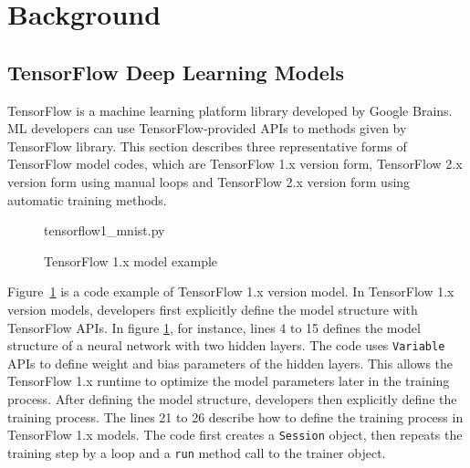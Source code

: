 \section{Background}\label{sec:background}
\subsection{TensorFlow Deep Learning Models}

TensorFlow\cite{tensorflow} is a machine learning platform library
developed by Google Brains.
ML developers can use TensorFlow-provided APIs to 
methods given by TensorFlow library.
This section describes three representative forms of TensorFlow
model codes, which are TensorFlow 1.x version form, 
TensorFlow 2.x version form using manual loops and
TensorFlow 2.x version form using automatic training methods.

\begin{figure}[ht!]

{tensorflow1_mnist.py}
  \caption{TensorFlow 1.x model example}
\label{fig:back:tf1}
\end{figure}

Figure~\ref{fig:back:tf1} is a code example of TensorFlow 1.x version model.
In TensorFlow 1.x version models, developers first explicitly define
the model structure with TensorFlow APIs.
In figure \ref{fig:back:tf1}, for instance, lines 4 to 15 defines the model
structure of a neural network with two hidden layers.
The code uses {\tt Variable} APIs to define weight and bias parameters of
the hidden layers. This allows the TensorFlow 1.x runtime to
optimize the model parameters later in the training process.
After defining the model structure, developers then
explicitly define the training process.
The lines 21 to 26 describe how to define the training process in TensorFlow
1.x models. The code first creates a {\tt Session} object,
then repeats the training step by a loop and a {\tt run} method call to the
trainer object. 

